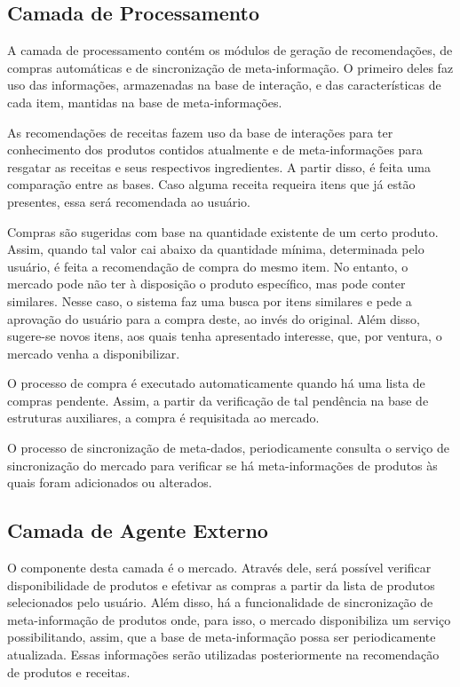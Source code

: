 \subsection{Camada de Processamento}

A camada de processamento contém os módulos de geração de recomendações, de compras automáticas e de sincronização de meta-informação. O primeiro deles faz uso das informações, armazenadas na base de interação, e das características de cada item, mantidas na base de meta-informações.

As recomendações de receitas fazem uso da base de interações para ter conhecimento dos produtos contidos atualmente e de meta-informações para resgatar as receitas e seus respectivos ingredientes. A partir disso, é feita uma comparação entre as bases. Caso alguma receita requeira itens que já estão presentes, essa será recomendada ao usuário. %

Compras são sugeridas com base na quantidade existente de um certo produto. Assim, quando tal valor cai abaixo da quantidade mínima, determinada pelo usuário, é feita a recomendação de compra do mesmo item. No entanto, o mercado pode não ter à disposição o produto específico, mas pode conter similares. Nesse caso, o sistema faz uma busca por itens similares e pede a aprovação do usuário para a compra deste, ao invés do original. Além disso, sugere-se novos itens, aos quais tenha apresentado interesse, que, por ventura, o mercado venha a disponibilizar.

O processo de compra é executado automaticamente quando há uma lista de compras pendente. Assim, a partir da verificação de tal pendência na base de estruturas auxiliares, a compra é requisitada ao mercado. 

O processo de sincronização de meta-dados, periodicamente consulta o serviço de sincronização do mercado para verificar se há meta-informações de produtos às quais foram adicionados ou alterados.

\subsection{Camada de Agente Externo}

O componente desta camada é o mercado. Através dele, será possível verificar disponibilidade de produtos e efetivar as compras a partir da lista de produtos selecionados pelo usuário. Além disso, há a funcionalidade de sincronização de meta-informação de produtos onde, para isso, o mercado disponibiliza um serviço possibilitando, assim, que a base de meta-informação possa ser periodicamente atualizada. Essas informações serão utilizadas posteriormente na recomendação de produtos e receitas.



